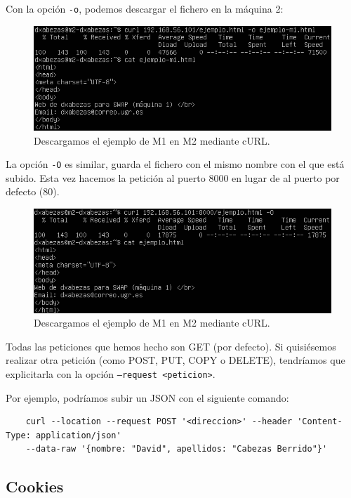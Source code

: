 \documentclass{article}
\begin{document}
Con la opción \texttt{-o}, podemos descargar el fichero en la máquina 2:

\begin{figure}[H]
	\centering
	\includegraphics[width=140mm]{imgs/curl-o}
	\caption{Descargamos el ejemplo de M1 en M2 mediante cURL.}
	\label{fig:curl-o}
\end{figure}

La opción \texttt{-O} es similar, guarda el fichero con el mismo nombre con el que está subido. Esta vez hacemos la petición
al puerto 8000 en lugar de al puerto por defecto (80).

\begin{figure}[H]
	\centering
	\includegraphics[width=140mm]{imgs/curl-O}
	\caption{Descargamos el ejemplo de M1 en M2 mediante cURL.}
	\label{fig:curl-O}
\end{figure}

Todas las peticiones que hemos hecho son GET (por defecto). Si quisiésemos realizar otra petición (como POST,
PUT, COPY o DELETE), tendríamos que explicitarla con la opción \texttt{--request <peticion>}.

Por ejemplo, podríamos subir un JSON con el siguiente comando:

\begin{verbatim}
	curl --location --request POST '<direccion>' --header 'Content-Type: application/json'
	--data-raw '{nombre: "David", apellidos: "Cabezas Berrido"}'
\end{verbatim}

\subsection{Cookies}
\end{document}
